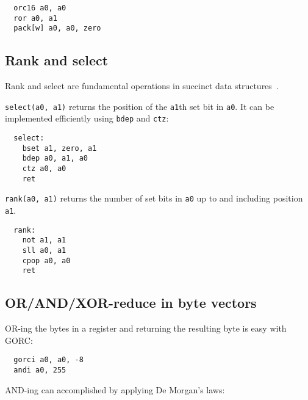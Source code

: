 \begin{verbatim}
  orc16 a0, a0
  ror a0, a1
  pack[w] a0, a0, zero
\end{verbatim}


\subsection{Rank and select}

Rank and select are fundamental operations in succinct data structures~\cite{SelectX86}.

\texttt{select(a0, a1)} returns the position of the \texttt{a1}th set bit in \texttt{a0}.
It can be implemented efficiently using \texttt{bdep} and \texttt{ctz}:

\begin{minipage}{\linewidth}
\begin{verbatim}
  select:
    bset a1, zero, a1
    bdep a0, a1, a0
    ctz a0, a0
    ret
\end{verbatim}
\end{minipage}

\texttt{rank(a0, a1)} returns the number of set bits in \texttt{a0} up to and
including position \texttt{a1}.

\begin{minipage}{\linewidth}
\begin{verbatim}
  rank:
    not a1, a1
    sll a0, a1
    cpop a0, a0
    ret
\end{verbatim}
\end{minipage}


\subsection{OR/AND/XOR-reduce in byte vectors}

OR-ing the bytes in a register and returning the resulting byte is
easy with GORC:

\begin{minipage}{\linewidth}
\begin{verbatim}
  gorci a0, a0, -8
  andi a0, 255
\end{verbatim}
\end{minipage}

AND-ing can accomplished by applying De Morgan's laws:

